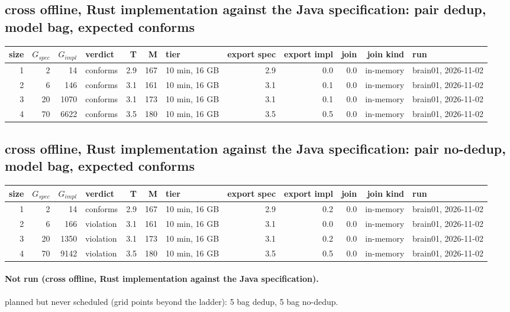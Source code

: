 \documentclass[10pt]{article}
\begin{document}
\subsection*{cross offline, Rust implementation against the Java specification: pair \textsf{dedup}, model bag, expected conforms}
\begin{longtable}{@{}rrrlrrlrrrrl@{}}
\toprule
size & $G_{\mathit{spec}}$ & $G_{\mathit{impl}}$ & verdict & T & M & tier & export spec & export impl & join & join kind & run \\
\midrule
\endhead
\color{red} 1 & 2 & 14 & conforms & 2.9 & 167 & 10 min, 16 GB & 2.9 & 0.0 & 0.0 & in-memory & brain01, 2026-11-02 \\
\color{red} 2 & 6 & 146 & conforms & 3.1 & 161 & 10 min, 16 GB & 3.1 & 0.1 & 0.0 & in-memory & brain01, 2026-11-02 \\
\color{red} 3 & 20 & 1070 & conforms & 3.1 & 173 & 10 min, 16 GB & 3.1 & 0.1 & 0.0 & in-memory & brain01, 2026-11-02 \\
\color{red} 4 & 70 & 6622 & conforms & 3.5 & 180 & 10 min, 16 GB & 3.5 & 0.5 & 0.0 & in-memory & brain01, 2026-11-02 \\
\bottomrule
\end{longtable}
\subsection*{cross offline, Rust implementation against the Java specification: pair \textsf{no-dedup}, model bag, expected conforms}
\begin{longtable}{@{}rrrlrrlrrrrl@{}}
\toprule
size & $G_{\mathit{spec}}$ & $G_{\mathit{impl}}$ & verdict & T & M & tier & export spec & export impl & join & join kind & run \\
\midrule
\endhead
\color{red} 1 & 2 & 14 & conforms & 2.9 & 167 & 10 min, 16 GB & 2.9 & 0.2 & 0.0 & in-memory & brain01, 2026-11-02 \\
\color{red} 2 & 6 & 166 & violation & 3.1 & 161 & 10 min, 16 GB & 3.1 & 0.0 & 0.0 & in-memory & brain01, 2026-11-02 \\
\color{red} 3 & 20 & 1350 & violation & 3.1 & 173 & 10 min, 16 GB & 3.1 & 0.2 & 0.0 & in-memory & brain01, 2026-11-02 \\
\color{red} 4 & 70 & 9142 & violation & 3.5 & 180 & 10 min, 16 GB & 3.5 & 0.5 & 0.0 & in-memory & brain01, 2026-11-02 \\
\bottomrule
\end{longtable}
\paragraph{Not run (cross offline, Rust implementation against the Java specification).}
planned but never scheduled (grid points beyond the ladder): 5 bag dedup, 5 bag no-dedup.\par
\end{document}
